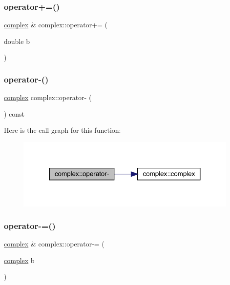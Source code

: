 \mbox{\label{classcomplex_ae776ea1bee9bed9540597a671abc3953}} 
\subsubsection{\texorpdfstring{operator+=()}{operator+=()}\hspace{0.1cm}{\footnotesize\ttfamily [2/2]}}
{\footnotesize\ttfamily \mbox{\hyperlink{classcomplex}{complex}} \& complex\+::operator+= (\begin{DoxyParamCaption}\item[{double}]{b }\end{DoxyParamCaption})}

\mbox{\label{classcomplex_a969988c8e6c2a3af52c64e531471f6c0}} 
\subsubsection{\texorpdfstring{operator-\/()}{operator-()}}
{\footnotesize\ttfamily \mbox{\hyperlink{classcomplex}{complex}} complex\+::operator-\/ (\begin{DoxyParamCaption}{ }\end{DoxyParamCaption}) const}

Here is the call graph for this function\+:
\nopagebreak
\begin{figure}[H]
\begin{center}
\leavevmode
\includegraphics[width=311pt]{classcomplex_a969988c8e6c2a3af52c64e531471f6c0_cgraph}
\end{center}
\end{figure}
\mbox{\label{classcomplex_af797416b6b4b45c2bb54958fcd076a0e}} 
\subsubsection{\texorpdfstring{operator-\/=()}{operator-=()}\hspace{0.1cm}{\footnotesize\ttfamily [1/2]}}
{\footnotesize\ttfamily \mbox{\hyperlink{classcomplex}{complex}} \& complex\+::operator-\/= (\begin{DoxyParamCaption}\item[{\mbox{\hyperlink{classcomplex}{complex}}}]{b }\end{DoxyParamCaption})}

